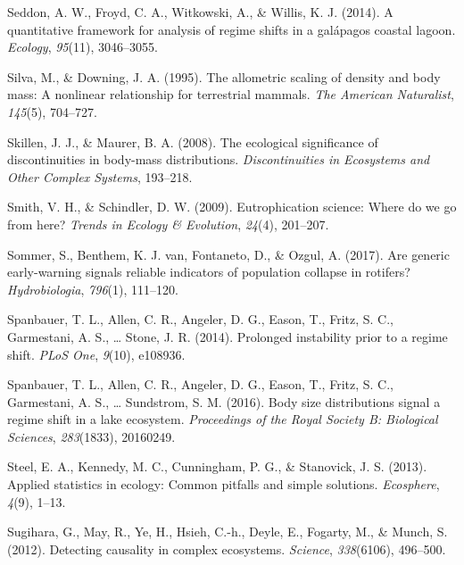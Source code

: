\documentclass[12pt,twoside,openany]{reedthesis}
\begin{document}
\leavevmode\hypertarget{ref-seddon2014quantitative}{}%
Seddon, A. W., Froyd, C. A., Witkowski, A., \& Willis, K. J. (2014). A quantitative framework for analysis of regime shifts in a galápagos coastal lagoon. \emph{Ecology}, \emph{95}(11), 3046--3055.

\leavevmode\hypertarget{ref-silva1995allometric}{}%
Silva, M., \& Downing, J. A. (1995). The allometric scaling of density and body mass: A nonlinear relationship for terrestrial mammals. \emph{The American Naturalist}, \emph{145}(5), 704--727.

\leavevmode\hypertarget{ref-skillen2008ecological}{}%
Skillen, J. J., \& Maurer, B. A. (2008). The ecological significance of discontinuities in body-mass distributions. \emph{Discontinuities in Ecosystems and Other Complex Systems}, 193--218.

\leavevmode\hypertarget{ref-smith2009eutrophication}{}%
Smith, V. H., \& Schindler, D. W. (2009). Eutrophication science: Where do we go from here? \emph{Trends in Ecology \& Evolution}, \emph{24}(4), 201--207.

\leavevmode\hypertarget{ref-sommer2017generic}{}%
Sommer, S., Benthem, K. J. van, Fontaneto, D., \& Ozgul, A. (2017). Are generic early-warning signals reliable indicators of population collapse in rotifers? \emph{Hydrobiologia}, \emph{796}(1), 111--120.

\leavevmode\hypertarget{ref-spanbauer_prolonged_2014}{}%
Spanbauer, T. L., Allen, C. R., Angeler, D. G., Eason, T., Fritz, S. C., Garmestani, A. S., \ldots{} Stone, J. R. (2014). Prolonged instability prior to a regime shift. \emph{PLoS One}, \emph{9}(10), e108936.

\leavevmode\hypertarget{ref-spanbauer2016body}{}%
Spanbauer, T. L., Allen, C. R., Angeler, D. G., Eason, T., Fritz, S. C., Garmestani, A. S., \ldots{} Sundstrom, S. M. (2016). Body size distributions signal a regime shift in a lake ecosystem. \emph{Proceedings of the Royal Society B: Biological Sciences}, \emph{283}(1833), 20160249.

\leavevmode\hypertarget{ref-steel2013applied}{}%
Steel, E. A., Kennedy, M. C., Cunningham, P. G., \& Stanovick, J. S. (2013). Applied statistics in ecology: Common pitfalls and simple solutions. \emph{Ecosphere}, \emph{4}(9), 1--13.

\leavevmode\hypertarget{ref-sugihara2012detecting}{}%
Sugihara, G., May, R., Ye, H., Hsieh, C.-h., Deyle, E., Fogarty, M., \& Munch, S. (2012). Detecting causality in complex ecosystems. \emph{Science}, \emph{338}(6106), 496--500.
\end{document}
